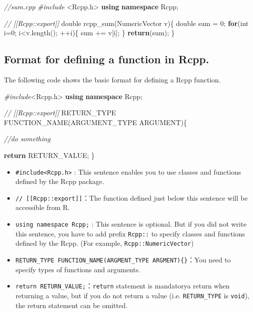 \documentclass[]{book}
\newenvironment{Shaded}{\begin{snugshade}}{\end{snugshade}}
\newcommand{\KeywordTok}[1]{\textcolor[rgb]{0.13,0.29,0.53}{\textbf{#1}}}
\newcommand{\DataTypeTok}[1]{\textcolor[rgb]{0.13,0.29,0.53}{#1}}
\newcommand{\DecValTok}[1]{\textcolor[rgb]{0.00,0.00,0.81}{#1}}
\newcommand{\ImportTok}[1]{#1}
\newcommand{\CommentTok}[1]{\textcolor[rgb]{0.56,0.35,0.01}{\textit{#1}}}
\newcommand{\ControlFlowTok}[1]{\textcolor[rgb]{0.13,0.29,0.53}{\textbf{#1}}}
\newcommand{\PreprocessorTok}[1]{\textcolor[rgb]{0.56,0.35,0.01}{\textit{#1}}}
\newcommand{\NormalTok}[1]{#1}
\theoremstyle{definition}
\theoremstyle{definition}
\theoremstyle{remark}
\begin{document}
\begin{Shaded}
\begin{Highlighting}[]
\CommentTok{//sum.cpp}
\PreprocessorTok{#include }\ImportTok{<Rcpp.h>}
\KeywordTok{using} \KeywordTok{namespace}\NormalTok{ Rcpp;}

\CommentTok{// [[Rcpp::export]]}
\DataTypeTok{double}\NormalTok{ rcpp_sum(NumericVector v)\{}
    \DataTypeTok{double}\NormalTok{ sum = }\DecValTok{0}\NormalTok{;}
    \ControlFlowTok{for}\NormalTok{(}\DataTypeTok{int}\NormalTok{ i=}\DecValTok{0}\NormalTok{; i<v.length(); ++i)\{}
\NormalTok{        sum += v[i];}
\NormalTok{    \}}
    \ControlFlowTok{return}\NormalTok{(sum);}
\NormalTok{\}}
\end{Highlighting}
\end{Shaded}

\subsection{Format for defining a function in
Rcpp.}\label{format-for-defining-a-function-in-rcpp.}

The following code shows the basic format for defining a Rcpp function.

\begin{Shaded}
\begin{Highlighting}[]
\PreprocessorTok{#include}\ImportTok{<Rcpp.h>}
\KeywordTok{using} \KeywordTok{namespace}\NormalTok{ Rcpp;}

\CommentTok{// [[Rcpp::export]]}
\NormalTok{RETURN_TYPE FUNCTION_NAME(ARGUMENT_TYPE ARGUMENT)\{}

    \CommentTok{//do something}

    \ControlFlowTok{return}\NormalTok{ RETURN_VALUE;}
\NormalTok{\}}
\end{Highlighting}
\end{Shaded}

\begin{itemize}
\item
  \texttt{\#include\textless{}Rcpp.h\textgreater{}} : This sentence
  enables you to use classes and functions defined by the Rcpp package.
\item
  \texttt{//\ {[}{[}Rcpp::export{]}{]}}：The function defined just below
  this sentence will be accessible from R.
\item
  \texttt{using\ namespace\ Rcpp;} : This sentence is optional. But if
  you did not write this sentence, you have to add prefix
  \texttt{Rcpp::} to specify classes and functions defined by the Rcpp.
  (For example, \texttt{Rcpp::NumericVector})
\item
  \texttt{RETURN\_TYPE\ FUNCTION\_NAME(ARGMENT\_TYPE\ ARGMENT)\{\}}：You
  need to specify types of functions and arguments.
\item
  \texttt{return\ RETURN\_VALUE;}：\texttt{return} statement is
  mandatorya return when returning a value, but if you do not return a
  value (i.e. \texttt{RETURN\_TYPE} is \texttt{void}), the return
  statement can be omitted.
\end{itemize}
\end{document}
